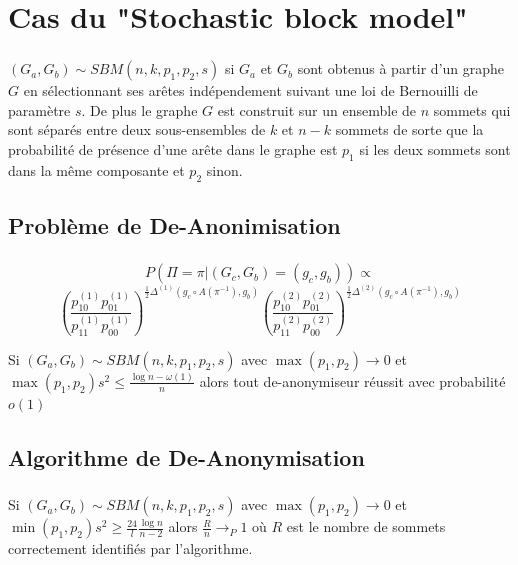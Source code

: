 \documentclass[11pt]{beamer}
\begin{document}
\section{Cas du "Stochastic block model"}

\begin{frame}
\frametitle{\insertsection}
$(G_a,G_b) \sim SBM(n,k,p_1,p_2,s)$ si $G_a$ et $G_b$  sont obtenus à partir d'un graphe $G$ en sélectionnant ses arêtes indépendement suivant une loi de Bernouilli de paramètre $s$. De plus le graphe $G$ est construit sur un ensemble de $n$ sommets qui sont séparés entre deux sous-ensembles de $k$ et $n-k$ sommets de sorte que la probabilité de présence d'une arête dans le graphe est $p_1$ si les deux sommets sont dans la même composante et $p_2$ sinon.
\end{frame}

\subsection{Problème de De-Anonimisation}

\begin{frame}
\frametitle{\insertsubsection}
\[
P(\Pi = \pi|(G_c,G_b) = (g_c,g_b)) \propto \]\[(\frac{p_{10}^{(1)}p_{01}^{(1)}}{p_{11}^{(1)}p_{00}^{(1)}})^{\frac{1}{2} \Delta^{(1)}(g_c \circ A(\pi^{-1}), g_b)}(\frac{p_{10}^{(2)}p_{01}^{(2)}}{p_{11}^{(2)}p_{00}^{(2)}})^{\frac{1}{2} \Delta^{(2)}(g_c \circ A(\pi^{-1}), g_b)}
\]
\begin{theoreme}
Si $(G_a,G_b) \sim SBM(n,k,p_1,p_2,s)$ avec $\max(p_1,p_2) \rightarrow 0$ et $\max(p_1,p_2)s^2 \leq \frac{\log n - \omega(1)}{n}$ alors tout de-anonymiseur réussit avec probabilité $o(1)$
\end{theoreme}
\end{frame}

\subsection{Algorithme de De-Anonymisation}

\begin{frame}
\frametitle{\insertsubsection}
\begin{theoreme}
Si $(G_a,G_b) \sim SBM(n,k,p_1,p_2,s)$ avec $\max(p_1,p_2) \rightarrow 0$ et $\min(p_1,p_2)s^2 \geq \frac{24}{l} \frac{\log n}{n-2}$ alors $\frac{R}{n} \rightarrow_{P} 1$ où $R$ est le nombre de sommets correctement identifiés par l'algorithme.

\end{theoreme}
\end{frame}
\end{document}
